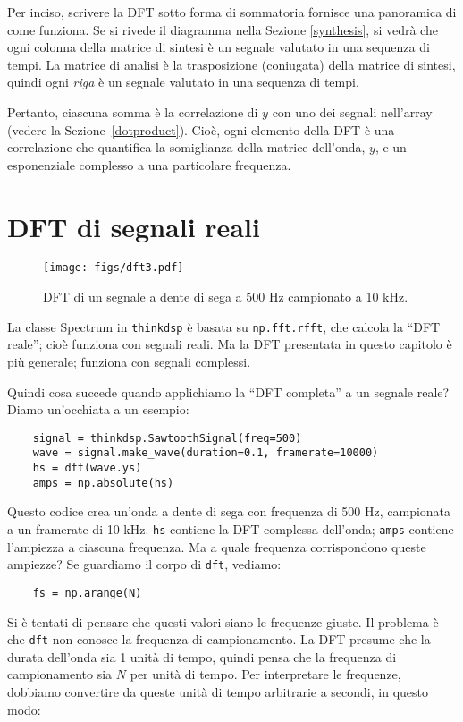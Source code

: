 \documentclass[12pt]{book} \usepackage[width=5.5in,height=8.5in, hmarginratio=3:2,vmarginratio=1:1]{geometry}
\begin{document}
Per inciso, scrivere la DFT sotto forma di sommatoria fornisce una panoramica di come funziona. Se si rivede il diagramma nella Sezione \ref{synthesis}, si vedrà che ogni colonna della matrice di sintesi è un segnale valutato in una sequenza di tempi. La matrice di analisi è la trasposizione (coniugata) della matrice di sintesi, quindi ogni {\em riga} è un segnale valutato in una sequenza di tempi.

Pertanto, ciascuna somma è la correlazione di $y$ con uno dei segnali nell'array (vedere la Sezione~\ref{dotproduct}). Cioè, ogni elemento della DFT è una correlazione che quantifica la somiglianza della matrice dell'onda, $y$, e un esponenziale complesso a una particolare frequenza.

\section{DFT di segnali reali} 

\begin{figure} 

\centerline{\texttt{[image: figs/dft3.pdf]}} \caption{DFT di un segnale a dente di sega a 500 Hz campionato a 10 kHz.} \label{fig.dft3} \end{figure} 

La classe Spectrum in {\tt thinkdsp} è basata su {\tt np.fft.rfft}, che calcola la ``DFT reale''; cioè funziona con segnali reali. Ma la DFT presentata in questo capitolo è più generale; funziona con segnali complessi.

Quindi cosa succede quando applichiamo la ``DFT completa'' a un segnale reale? Diamo un'occhiata a un esempio:

\begin{verbatim} 
    signal = thinkdsp.SawtoothSignal(freq=500)
    wave = signal.make_wave(duration=0.1, framerate=10000)
    hs = dft(wave.ys)
    amps = np.absolute(hs)
 \end{verbatim} 

Questo codice crea un'onda a dente di sega con frequenza di 500 Hz, campionata a un framerate di 10 kHz. {\tt hs} contiene la DFT complessa dell'onda; {\tt amps} contiene l'ampiezza a ciascuna frequenza. Ma a quale frequenza corrispondono queste ampiezze? Se guardiamo il corpo di {\tt dft}, vediamo:

\begin{verbatim} 
    fs = np.arange(N)
 \end{verbatim} 

Si è tentati di pensare che questi valori siano le frequenze giuste. Il problema è che {\tt dft} non conosce la frequenza di campionamento. La DFT presume che la durata dell'onda sia 1 unità di tempo, quindi pensa che la frequenza di campionamento sia $N$ per unità di tempo. Per interpretare le frequenze, dobbiamo convertire da queste unità di tempo arbitrarie a secondi, in questo modo:
\end{document}
